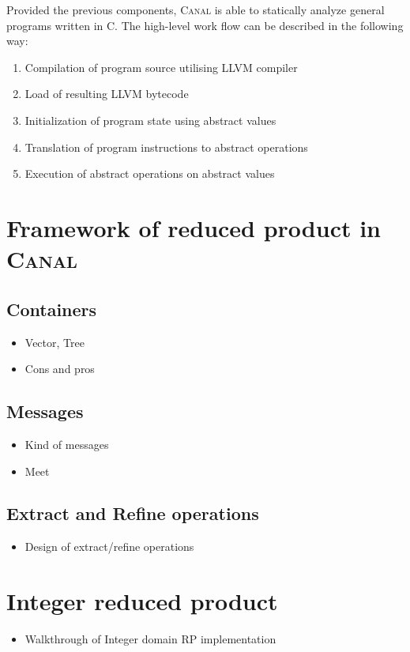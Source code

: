 \documentclass[12pt,oneside,draft]{fithesis2}
\begin{document}
Provided the previous components, \textsc{Canal} is able to statically analyze general programs written in C. The high-level work flow can be described in the following way:

\begin{enumerate}
  \item Compilation of program source utilising LLVM compiler
  \item Load of resulting LLVM bytecode
  \item Initialization of program state using abstract values
  \item Translation of program instructions to abstract operations
  \item Execution of abstract operations on abstract values
\end{enumerate}

\section{Framework of reduced product in \textsc{Canal}}

\subsection{Containers}
\begin{itemize}
  \item Vector, Tree
  \item Cons and pros
\end{itemize}

\subsection{Messages}
\begin{itemize}
  \item Kind of messages
  \item Meet
\end{itemize}

\subsection{Extract and Refine operations}
\begin{itemize}
  \item Design of extract/refine operations
\end{itemize}

\section{Integer reduced product}
\begin{itemize}
  \item Walkthrough of Integer domain RP implementation
\end{itemize}
\end{document}
